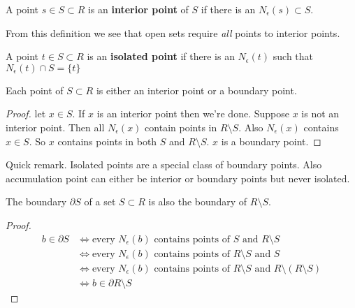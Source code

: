 \documentclass{article}
\begin{document}
\begin{definition}
    A point \( s \in S \subset R \) is an \textbf{interior point} of \( S \) if
    there is an \( N_\epsilon(s) \subset S \).
\end{definition}

From this definition we see that open sets require \textit{all} points to interior points.

\begin{definition}
    A point \( t \in S \subset R \) is an \textbf{isolated point} if there is an
    \( N_\epsilon(t) \) such that \( N_\epsilon(t) \cap S = \{t\} \)
\end{definition}

\begin{proposition}
    Each point of \( S \subset R \) is either an interior point or a boundary point.
\end{proposition}

\begin{proof}
    let \( x \in S \). If \( x \) is an interior point then we're done. Suppose \( x \) 
    is not an interior point. Then all \( N_\epsilon(x) \) contain points in \( R \setminus S \).
    Also  \( N_\epsilon(x) \) contains \( x \in S \). So \( x \) contains points in both 
    \( S \) and \( R \setminus S \). \( x \) is a boundary point.
\end{proof}

Quick remark. Isolated points are a special class of boundary points. Also accumulation 
point can either be interior or boundary points but never isolated.

\begin{proposition}
    The boundary \( \partial S \) of a set \( S \subset R \) is also the boundary of
    \( R \setminus S \).
\end{proposition}


\begin{proof}
    \begin{align*}
        b \in \partial S  &\iff \text{every }  N_\epsilon(b) \text{ contains points of } S \text{ and  } R \setminus S \\
                          &\iff \text{every }  N_\epsilon(b) \text{ contains points of } R \setminus S \text{ and  } S \\
                          &\iff \text{every }  N_\epsilon(b) \text{ contains points of } R \setminus S \text{ and  }  R \setminus (R \setminus S)\\
                            &\iff b \in \partial R \setminus S
    \end{align*}
\end{proof}
\end{document}
